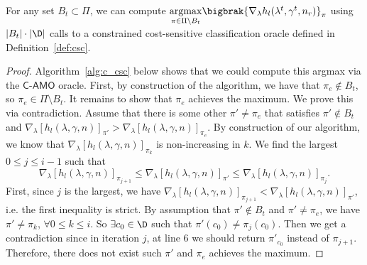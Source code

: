 \documentclass{article}
\newcommand{\1}{\mathbf{1}}
\begin{document}
\begin{lemma}\label{lem:restricted_csc}
For any set $B_t\subset\Pi$, we can compute $\underset{\pi\in\Pi\setminus B_t}{\operatorname{argmax}}\bigbrak{\nabla_\lambda h_{l}(\lambda^{t},\gamma^{t},n_r)}_\pi$ using $|B_t|\cdot|\D|$ calls to a constrained cost-sensitive classification oracle defined in Definition~\ref{def:csc}. 
\end{lemma}
\begin{proof}
Algorithm~\ref{alg:c_csc} below shows that we could compute this argmax via the $\textsf{C-AMO}$ oracle. First, by construction of the algorithm, we have that $\pi_e\not\in B_t$, so $\pi_e\in\Pi\setminus B_t$. It remains to show that $\pi_e$ achieves the maximum. We prove this via contradiction. Assume that there is some other $\pi'\ne \pi_e$ that satisfies $\pi'\not\in B_t$ and $\nabla_\lambda[h_l(\lambda,\gamma,n)]_{\pi'}>\nabla_\lambda[h_l(\lambda,\gamma,n)]_{\pi_e}$. By construction of our algorithm, we know that $\nabla_\lambda[h_l(\lambda,\gamma,n)]_{\pi_{k}}$ is non-increasing in $k$. We find the largest $0\leq j\leq i-1$ such that $$\nabla_\lambda[h_l(\lambda,\gamma,n)]_{\pi_{j+1}}\leq\nabla_\lambda[h_l(\lambda,\gamma,n)]_{\pi'}\leq \nabla_\lambda[h_l(\lambda,\gamma,n)]_{\pi_{j}}.$$ First, since $j$ is the largest, we have $\nabla_\lambda[h_l(\lambda,\gamma,n)]_{\pi_{j+1}}<\nabla_\lambda[h_l(\lambda,\gamma,n)]_{\pi'}$, i.e. the first inequality is strict. By assumption that $\pi'\not\in B_t$ and $\pi'\ne \pi_e$, we have $\pi'\ne\pi_k$, $\forall 0\leq k\leq i$. So $\exists c_0\in\D$ such that $\pi'(c_0)\ne \pi_j(c_0)$. Then we get a contradiction since in iteration $j$, at line 6 we should return $\pi'_{c_0}$ instead of $\pi_{j+1}$. Therefore, there does not exist such $\pi'$ and $\pi_e$ achieves the maximum. 
\end{proof}
\end{document}
